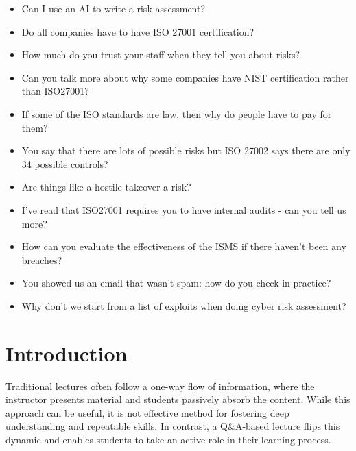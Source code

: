 \documentclass[12pt]{article}
\begin{document}
\begin{itemize}
  \item Can I use an AI to write a risk assessment?
  \item Do all companies have to have ISO 27001 certification?
  \item How much do you trust your staff when they tell you about risks?
  \item Can you talk more about why some companies have NIST certification rather than ISO27001?
  \item If some of the ISO standards are law, then why do people have to pay for them?
  \item You say that there are lots of possible risks but ISO 27002 says there are only 34 possible controls?
  \item Are things like a hostile takeover a risk?
  \item I've read that ISO27001 requires you to have internal audits - can you tell us more?
  \item How can you evaluate the effectiveness of the ISMS if there haven't been any breaches?
  \item You showed us an email that wasn't spam: how do you check in practice?
  \item Why don't we start from a list of exploits when doing cyber risk assessment?
\end{itemize}







\maketitle

\section*{Introduction}

Traditional lectures often follow a one-way flow of information, where the instructor presents material and students passively absorb the content. 
While this approach can be useful, it is not effective method for fostering deep understanding and repeatable skills. In contrast, a Q\&A-based lecture flips this dynamic and enables students to take an active role in their learning process.\cite{reidsema2017flipped} 
\end{document}
